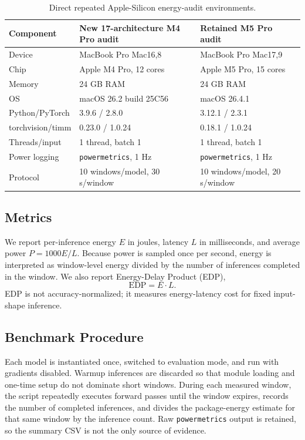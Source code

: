 \documentclass[conference]{IEEEtran}
\begin{document}
\begin{table}[t]
\centering
\caption{Direct repeated Apple-Silicon energy-audit environments.}
\label{tab:environment}
\begin{tabular}{lll}
\toprule
Component & New 17-architecture M4 Pro audit & Retained M5 Pro audit \\
\midrule
Device & MacBook Pro Mac16,8 & MacBook Pro Mac17,9 \\
Chip & Apple M4 Pro, 12 cores & Apple M5 Pro, 15 cores \\
Memory & 24 GB RAM & 24 GB RAM \\
OS & macOS 26.2 build 25C56 & macOS 26.4.1 \\
Python/PyTorch & 3.9.6 / 2.8.0 & 3.12.1 / 2.3.1 \\
torchvision/timm & 0.23.0 / 1.0.24 & 0.18.1 / 1.0.24 \\
Threads/input & 1 thread, batch 1 & 1 thread, batch 1 \\
Power logging & \texttt{powermetrics}, 1 Hz & \texttt{powermetrics}, 1 Hz \\
Protocol & 10 windows/model, 30 s/window & 10 windows/model, 20 s/window \\
\bottomrule
\end{tabular}
\end{table}

\subsection{Metrics}

We report per-inference energy $E$ in joules, latency $L$ in milliseconds, and
average power $P=1000E/L$. Because power is sampled once per second, energy is
interpreted as window-level energy divided by the number of inferences
completed in the window. We also report Energy-Delay Product (EDP),
\begin{equation}
    \mathrm{EDP} = E \cdot L.
\end{equation}
EDP is not accuracy-normalized; it measures energy-latency cost for fixed
input-shape inference.

\subsection{Benchmark Procedure}

Each model is instantiated once, switched to evaluation mode, and run with
gradients disabled. Warmup inferences are discarded so that module loading and
one-time setup do not dominate short windows. During each measured window, the
script repeatedly executes forward passes until the window expires, records
the number of completed inferences, and divides the package-energy estimate
for that same window by the inference count. Raw \texttt{powermetrics} output
is retained, so the summary CSV is not the only source of evidence.
\end{document}
